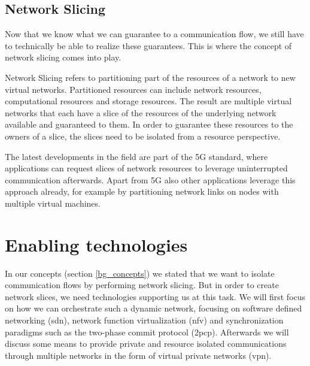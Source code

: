 \subsection{Network Slicing}
Now that we know what we can guarantee to a communication flow, we still have to technically be able to realize these guarantees. This is where the concept of network slicing comes into play.

Network Slicing \cite{slicing} refers to partitioning part of the resources of a network to new virtual networks. Partitioned resources can include network resources, computational resources and storage resources. The result are multiple virtual networks that each have a slice of the resources of the underlying network available and guaranteed to them. In order to guarantee these resources to the owners of a slice, the slices need to be isolated from a resource perspective.

The latest developments in the field are part of the 5G standard, where applications can request slices of network resources to leverage uninterrupted communication afterwards. Apart from 5G also other applications leverage this approach already, for example by partitioning network links on nodes with multiple virtual machines.

\section{Enabling technologies}
In our concepts (section \ref{bg_concepts}) we stated that we want to isolate communication flows by performing network slicing. But in order to create network slices, we need technologies supporting us at this task. We will first focus on how we can orchestrate such a dynamic network, focusing on software defined networking (\acrshort{sdn}), network function virtualization (\acrshort{nfv}) and synchronization paradigms such as the two-phase commit protocol (\acrshort{2pcp}). Afterwards we will discuss some means to provide private and resource isolated communications through multiple networks in the form of virtual private networks (\acrshort{vpn}).

